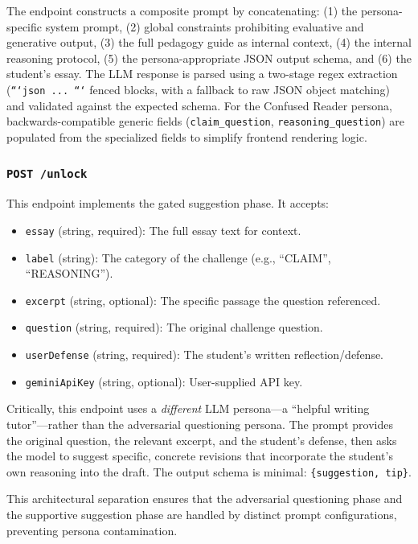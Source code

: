 \documentclass[11pt,a4paper]{article}
\begin{document}
The endpoint constructs a composite prompt by concatenating: (1) the persona-specific system prompt, (2) global constraints prohibiting evaluative and generative output, (3) the full pedagogy guide as internal context, (4) the internal reasoning protocol, (5) the persona-appropriate JSON output schema, and (6) the student's essay. The LLM response is parsed using a two-stage regex extraction (\texttt{```json ... ```} fenced blocks, with a fallback to raw JSON object matching) and validated against the expected schema. For the Confused Reader persona, backwards-compatible generic fields (\texttt{claim\_question}, \texttt{reasoning\_question}) are populated from the specialized fields to simplify frontend rendering logic.

\subsubsection{\texttt{POST /unlock}}

This endpoint implements the gated suggestion phase. It accepts:

\begin{itemize}[leftmargin=*]
    \item \texttt{essay} (string, required): The full essay text for context.
    \item \texttt{label} (string): The category of the challenge (e.g., ``CLAIM'', ``REASONING'').
    \item \texttt{excerpt} (string, optional): The specific passage the question referenced.
    \item \texttt{question} (string, required): The original challenge question.
    \item \texttt{userDefense} (string, required): The student's written reflection/defense.
    \item \texttt{geminiApiKey} (string, optional): User-supplied API key.
\end{itemize}

Critically, this endpoint uses a \textit{different} LLM persona---a ``helpful writing tutor''---rather than the adversarial questioning persona. The prompt provides the original question, the relevant excerpt, and the student's defense, then asks the model to suggest specific, concrete revisions that incorporate the student's own reasoning into the draft. The output schema is minimal: \texttt{\{suggestion, tip\}}.

This architectural separation ensures that the adversarial questioning phase and the supportive suggestion phase are handled by distinct prompt configurations, preventing persona contamination.
\end{document}
